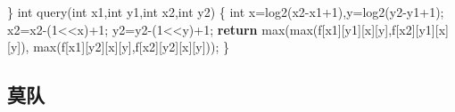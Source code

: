 \documentclass[
]{article}
\newenvironment{Shaded}{}{}
\newcommand{\ControlFlowTok}[1]{\textcolor[rgb]{0.00,0.44,0.13}{\textbf{#1}}}
\newcommand{\DataTypeTok}[1]{\textcolor[rgb]{0.56,0.13,0.00}{#1}}
\newcommand{\DecValTok}[1]{\textcolor[rgb]{0.25,0.63,0.44}{#1}}
\newcommand{\NormalTok}[1]{#1}
\begin{document}
\begin{Shaded}
\begin{Highlighting}[]
\NormalTok{\}}
\DataTypeTok{int}\NormalTok{ query(}\DataTypeTok{int}\NormalTok{ x1,}\DataTypeTok{int}\NormalTok{ y1,}\DataTypeTok{int}\NormalTok{ x2,}\DataTypeTok{int}\NormalTok{ y2)}
\NormalTok{\{}
    \DataTypeTok{int}\NormalTok{ x=log2(x2{-}x1+}\DecValTok{1}\NormalTok{),y=log2(y2{-}y1+}\DecValTok{1}\NormalTok{);}
\NormalTok{    x2=x2{-}(}\DecValTok{1}\NormalTok{\textless{}\textless{}x)+}\DecValTok{1}\NormalTok{;}
\NormalTok{    y2=y2{-}(}\DecValTok{1}\NormalTok{\textless{}\textless{}y)+}\DecValTok{1}\NormalTok{;}
    \ControlFlowTok{return}\NormalTok{ max(max(f[x1][y1][x][y],f[x2][y1][x][y]),}
\NormalTok{       max(f[x1][y2][x][y],f[x2][y2][x][y]));}
\NormalTok{\}}
\end{Highlighting}
\end{Shaded}

\hypertarget{ux83abux961f}{%
\subsection{莫队}\label{ux83abux961f}}
\end{document}
